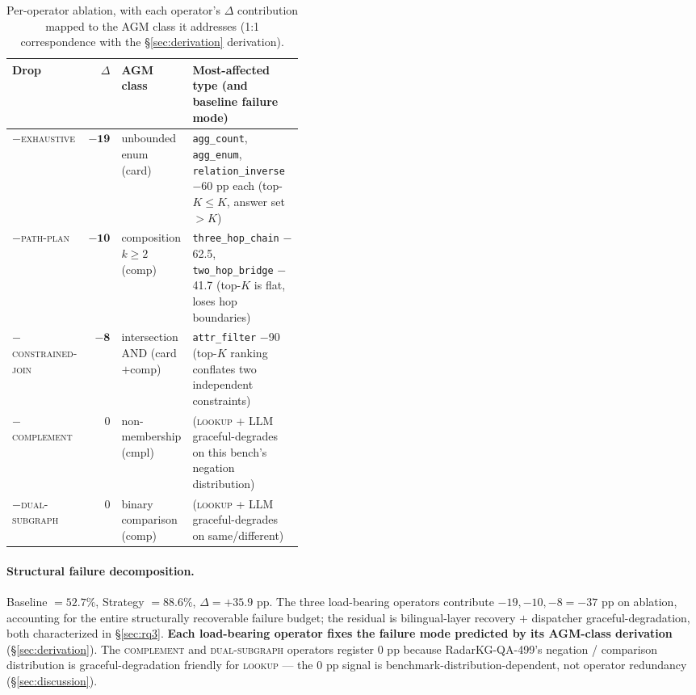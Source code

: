 \documentclass[10pt,a4paper,twocolumn]{article}
\newcommand{\qtype}[1]{\texttt{\small #1}}
\newcommand{\op}[1]{\textsc{\small #1}}
\begin{document}
\begin{table}[t]
\centering
\small
\caption{Per-operator ablation, with each operator's $\Delta$ contribution mapped to the AGM class it addresses (1:1 correspondence with the §\ref{sec:derivation} derivation).}
\label{tab:per-op}
\begin{tabular}{l r l p{0.42\linewidth}}
\toprule
\textbf{Drop} & \textbf{$\Delta$} & \textbf{AGM class} & \textbf{Most-affected type (and baseline failure mode)} \\
\midrule
$-$\op{exhaustive}        & $\mathbf{-19}$ & unbounded enum (\textsf{card}) & \qtype{agg\_count}, \qtype{agg\_enum}, \qtype{relation\_inverse} $-$60 pp each (top-$K\!\leq\!K$, answer set $> K$) \\
$-$\op{path-plan}         & $\mathbf{-10}$ & composition $k\!\geq\!2$ (\textsf{comp}) & \qtype{three\_hop\_chain} $-$62.5, \qtype{two\_hop\_bridge} $-$41.7 (top-$K$ is flat, loses hop boundaries) \\
$-$\op{constrained-join}  & $\mathbf{-8}$  & intersection AND (\textsf{card$+$comp}) & \qtype{attr\_filter} $-$90 (top-$K$ ranking conflates two independent constraints) \\
$-$\op{complement}        & 0              & non-membership (\textsf{cmpl}) & (\op{lookup} + LLM graceful-degrades on this bench's negation distribution) \\
$-$\op{dual-subgraph}     & 0              & binary comparison (\textsf{comp}) & (\op{lookup} + LLM graceful-degrades on same/different) \\
\bottomrule
\end{tabular}
\end{table}

\paragraph{Structural failure decomposition.}
Baseline $= 52.7\%$, Strategy $= 88.6\%$, $\Delta=+35.9$ pp. The three load-bearing operators contribute $-19, -10, -8 = -37$ pp on ablation, accounting for the entire structurally recoverable failure budget; the residual is bilingual-layer recovery $+$ dispatcher graceful-degradation, both characterized in §\ref{sec:rq3}. \textbf{Each load-bearing operator fixes the failure mode predicted by its AGM-class derivation} (§\ref{sec:derivation}). The \op{complement} and \op{dual-subgraph} operators register 0 pp because RadarKG-QA-499's negation / comparison distribution is graceful-degradation friendly for \op{lookup} --- the 0 pp signal is benchmark-distribution-dependent, not operator redundancy (§\ref{sec:discussion}).
\end{document}
